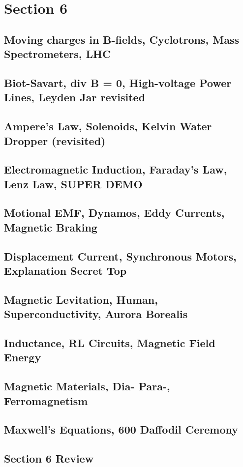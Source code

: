 \documentclass[../introphysics.tex]{subfiles}
\begin{document}
\chapter{Section 6}
\section{Moving charges in B-fields, Cyclotrons, Mass Spectrometers, LHC}
\section{Biot-Savart, div B = 0, High-voltage Power Lines, Leyden Jar revisited}
\section{Ampere's Law, Solenoids, Kelvin Water Dropper (revisited)}
\section{Electromagnetic Induction, Faraday's Law, Lenz Law, SUPER DEMO}
\section{Motional EMF, Dynamos, Eddy Currents, Magnetic Braking}
\section{Displacement Current, Synchronous Motors, Explanation Secret Top}
\section{Magnetic Levitation, Human, Superconductivity, Aurora Borealis}
\section{Inductance, RL Circuits, Magnetic Field Energy}
\section{Magnetic Materials, Dia- Para-, Ferromagnetism}
\section{Maxwell's Equations, 600 Daffodil Ceremony}
\section{Section 6 Review}
\end{document}
